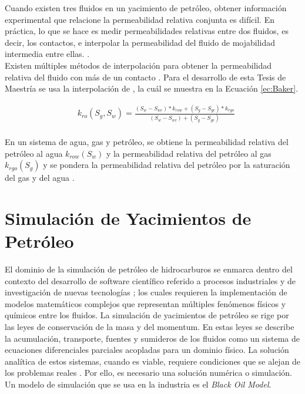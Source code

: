 Cuando existen tres fluidos en un yacimiento de petróleo, obtener información experimental que relacione la permeabilidad relativa conjunta es difícil. En práctica, lo que se hace es medir permeabilidades relativas entre dos fluidos, es decir, los contactos, e interpolar la permeabilidad del fluido de mojabilidad intermedia entre ellas. \citep{Zuo2014}.\\

Existen múltiples métodos de interpolación para obtener la permeabilidad relativa del fluido con más de un contacto \citep{Delshad1989, Blunt2000, Zuo2014}. Para el desarrollo de esta Tesis de Maestría se usa la interpolación de \cite{Baker1988}, la cuál se muestra en la Ecuación \ref{ec:Baker}.

\begin{align}
	\label{ec:Baker}&k_{ro}(S_{g}, S_{w}) = \frac{\left(S_{w}-S_{wc}\right)*k_{row} + \left(S_{g}-S_{gc}\right)*k_{rgo}}{\left(S_{w}-S_{wc}\right) + \left(S_{g}-S_{gc}\right)}
\end{align}\\

En un sistema de agua, gas y petróleo, se obtiene la permeabilidad relativa del petróleo al agua $k_{row}(S_{w})$ y la permeabilidad relativa del petróleo al gas $k_{rgo}(S_{g})$ y se pondera la permeabilidad relativa del petróleo por la saturación del gas y del agua \citep{Baker1988}.

\section{Simulación de Yacimientos de Petróleo}
El dominio de la simulación de petróleo de hidrocarburos se enmarca dentro del contexto del desarrollo de software científico referido a procesos industriales y de investigación de nuevas tecnologías \citep{Kelly2015}; los cuales requieren la implementación de modelos matemáticos complejos que representan múltiples fenómenos físicos y químicos entre los fluidos. La simulación de yacimientos de petróleo se rige por las leyes de conservación de la masa y del momentum. En estas leyes se describe la acumulación, transporte, fuentes y sumideros de los fluidos como un sistema de ecuaciones diferenciales parciales acopladas para un dominio físico. La solución analítica de estos sistemas, cuando es viable, requiere condiciones que se alejan de los problemas reales \citep{ertekin2001basic}. Por ello, es necesario una solución numérica o simulación. Un modelo de simulación que se usa en la industria es el \textit{Black Oil Model}.%


